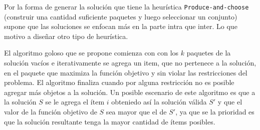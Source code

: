 Por la forma de generar la solución que tiene la heurística \texttt{Produce-and-choose} (construir una cantidad suficiente paquetes y luego seleccionar un conjunto) supone que las soluciones se enfocan más en la parte intra que inter. Lo que motivo a diseñar otro tipo de heurística.

El algoritmo goloso que se propone comienza con con los $k$ paquetes de la solución vacíos e iterativamente se agrega un item, que no pertenece a la solución, en el paquete que maximiza la función objetivo y sin violar las restricciones del problema. El algoritmo finaliza cuando por alguna restricción no es posible agregar más objetos a la solución. Un posible escenario de este algoritmo es que a la solución $S$ se le agrega el ítem $i$ obteniedo así la solución válida $S'$ y que el valor de la función objetivo de $S$ sea mayor que el de $S'$, ya que se la prioridad es que la solución resultante tenga la mayor cantidad de ítems posibles.


